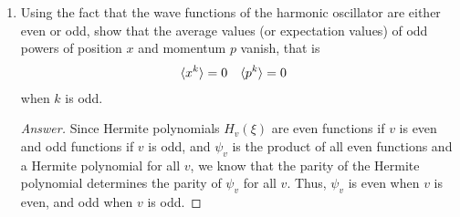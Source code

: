 \documentclass[../psets.tex]{subfiles}
\begin{document}
\begin{enumerate}
\begin{enumerate}
\begin{proof}[Answer]
            \begin{align*}
                \bar{\nu}_\text{obs} &= \frac{1}{2\pi c}\sqrt{\frac{k}{\mu}}\\
                k &= (2\pi c\bar{\nu}_\text{obs})^2\mu\\
                \Aboxed{k &= \SI[per-mode=symbol]{403}{\newton\per\meter}}
            \end{align*}
        \end{proof}
        \item The period of vibration.
        \begin{proof}[Answer]
            We have that
            \begin{align*}
                \frac{2\pi}{T} &= \omega = \sqrt{\frac{k}{\mu}}\\
                T &= 2\pi\sqrt{\frac{\mu}{k}}\\
                \Aboxed{T &= \SI{1.27e-14}{\second}}
            \end{align*}
        \end{proof}
        \item The zero-point energy.
        \begin{proof}[Answer]
            We have that
            \begin{align*}
                E_0 &= \frac{1}{2}\hbar\omega\\
                &= \frac{1}{2}\hbar\sqrt{\frac{k}{\nu}}\\
                \Aboxed{E_0 &= \SI{2.61e-20}{\joule}}
            \end{align*}
        \end{proof}
    \end{enumerate}
    \item Using the fact that the wave functions of the harmonic oscillator are either even or odd, show that the average values (or expectation values) of odd powers of position $x$ and momentum $p$ vanish, that is
    \begin{align*}
        \langle{x^k}\rangle &= 0&
        \langle{p^k}\rangle &= 0
    \end{align*}
    when $k$ is odd.
    \begin{proof}[Answer]
        Since Hermite polynomials $H_v(\xi)$ are even functions if $v$ is even and odd functions if $v$ is odd, and $\psi_v$ is the product of all even functions and a Hermite polynomial for all $v$, we know that the parity of the Hermite polynomial determines the parity of $\psi_v$ for all $v$. Thus, $\psi_v$ is even when $v$ is even, and odd when $v$ is odd.\par

\end{proof}
\end{enumerate}
\end{document}
